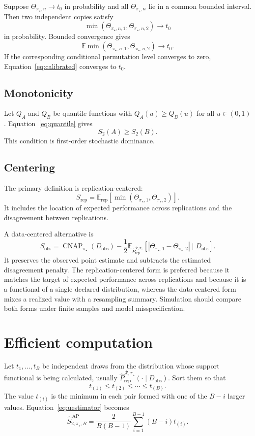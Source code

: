 \documentclass[11pt]{article}
\newcommand{\CNAP}{\operatorname{CNAP}}
\newcommand{\Regime}{\mathcal{R}}
\newcommand{\Tpi}{\CNAP_{\pi_\star}}
\newcommand{\E}{\mathbb{E}}
\newcommand{\SAPHatB}{\widehat S_{2,\pi_\star,B}^{\,\mathrm{AP}}}
\newcommand{\PRepHat}{\widehat{P}_{\mathrm{rep}}^{\Regime,\pi_\star}}
\theoremstyle{remark}
\begin{document}
Suppose $\Theta_{\pi_\star,n}\to t_0$ in probability and all $\Theta_{\pi_\star,n}$ lie in a common bounded interval. Then two independent copies satisfy
\[
\min(\Theta_{\pi_\star,n,1},\Theta_{\pi_\star,n,2})\to t_0
\]
in probability. Bounded convergence gives
\[
\E\min(\Theta_{\pi_\star,n,1},\Theta_{\pi_\star,n,2})\to t_0.
\]
If the corresponding conditional permutation level converges to zero, Equation~\eqref{eq:calibrated} converges to $t_0$.

\subsection{Monotonicity}

Let $Q_A$ and $Q_B$ be quantile functions with $Q_A(u)\geq Q_B(u)$ for all $u\in(0,1)$. Equation~\eqref{eq:quantile} gives
\[
S_2(A)\geq S_2(B).
\]
This condition is first-order stochastic dominance.

\subsection{Centering}
\label{app:centering}

The primary definition is replication-centered:
\[
S_{\mathrm{rep}}
=
\E_{\mathrm{rep}}
\left[
\min(\Theta_{\pi_\star,1},\Theta_{\pi_\star,2})
\right].
\]
It includes the location of expected performance across replications and the disagreement between replications.

A data-centered alternative is
\[
S_{\mathrm{obs}}
=
\Tpi(D_{\mathrm{obs}})
-
\frac12
\E_{\PRepHat}
\left[
|\Theta_{\pi_\star,1}-\Theta_{\pi_\star,2}|
\mid D_{\mathrm{obs}}
\right].
\]
It preserves the observed point estimate and subtracts the estimated disagreement penalty. The replication-centered form is preferred because it matches the target of expected performance across replications and because it is a functional of a single declared distribution, whereas the data-centered form mixes a realized value with a resampling summary. Simulation should compare both forms under finite samples and model misspecification.

\section{Efficient computation}
\label{app:computation}

Let $t_1,\ldots,t_B$ be independent draws from the distribution whose support functional is being calculated, usually $\PRepHat(\cdot\mid D_{\mathrm{obs}})$. Sort them so that
\[
t_{(1)}\leq t_{(2)}\leq\cdots\leq t_{(B)}.
\]
The value $t_{(i)}$ is the minimum in each pair formed with one of the $B-i$ larger values. Equation~\eqref{eq:uestimator} becomes
\begin{equation}
\SAPHatB
=
\frac{2}{B(B-1)}
\sum_{i=1}^{B-1}(B-i)t_{(i)}.
\label{eq:sorted}
\end{equation}
\end{document}
